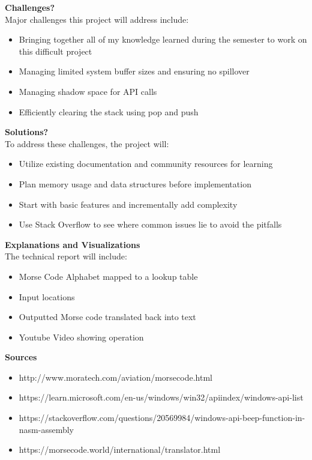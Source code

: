\documentclass[twoside]{article}
\begin{document}
\noindent \textbf{Challenges?} \\
Major challenges this project will address include:
\begin{itemize}
\item Bringing together all of my knowledge learned during the semester to work on this difficult project
\item Managing limited system buffer sizes and ensuring no spillover
\item Managing shadow space for API calls
\item Efficiently clearing the stack using pop and push \\ 
\end{itemize}

\noindent \textbf{Solutions?} \\
To address these challenges, the project will:
\begin{itemize}
\item Utilize existing documentation and community resources for learning
\item Plan memory usage and data structures before implementation
\item Start with basic features and incrementally add complexity
\item Use Stack Overflow to see where common issues lie to avoid the pitfalls \\ 
\end{itemize}

\noindent \textbf{Explanations and Visualizations} \\
The technical report will include:
\begin{itemize}
\item Morse Code Alphabet mapped to a lookup table
\item Input locations
\item Outputted Morse code translated back into text
\item Youtube Video showing operation
\end{itemize}

\noindent \textbf{Sources} \\
\begin{itemize}
\item http://www.moratech.com/aviation/morsecode.html
\item https://learn.microsoft.com/en-us/windows/win32/apiindex/windows-api-list 
\item https://stackoverflow.com/questions/20569984/windows-api-beep-function-in-nasm-assembly 
\item https://morsecode.world/international/translator.html
\end{itemize}
\end{document}
